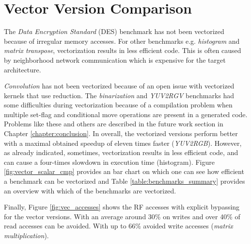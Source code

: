 
\section{Vector Version Comparison}
The \emph{Data Encryption Standard} (DES) benchmark has not been vectorized because of irregular memory accesses. For other benchmarks e.g. \emph{histogram} and \emph{matrix transpose}, vectorization results in less efficient code. This is often caused by neighborhood network communication which is expensive for the target architecture.

\emph{Convolution} has not been vectorized because of an open issue with vectorized kernels that use reduction. The \emph{binarization} and \emph{YUV2RGV} benchmarks had some difficulties during vectorization because of a compilation problem when multiple set-flag and conditional move operations are present in a generated code. Problems like these and others are described in the future work section in Chapter \ref{chapter:conclusion}. In overall, the vectorized versions perform better with a maximal obtained speedup of eleven times faster (\emph{YUV2RGB}). However, as already indicated, sometimes, vectorization results in less efficient code, and can cause a four-times slowdown in execution time (histogram). Figure \ref{fig:vector_scalar_cmp} provides an bar chart on which one can see how efficient a benchmark can be vectorized and Table \ref{table:benchmarks_summary} provides an overview with which of the benchmarks are vectorized.

Finally, Figure \ref{fig:vec_accesses} shows the RF accesses with explicit bypassing for the vector versions. With an average around 30\% on writes and over 40\% of read accesses can be avoided. With up to 66\% avoided write accesses (\emph{matrix multiplication}).

